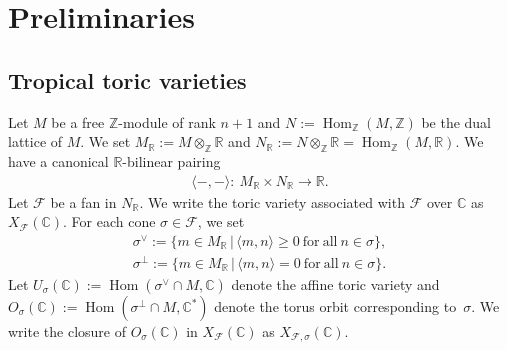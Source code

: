 \documentclass[10pt,a4paper]{amsart}
\numberwithin{equation}{section}
\begin{document}
\section{Preliminaries}\label{sc:2}

\subsection{Tropical toric varieties}

Let $M$ be a free ${\mathbb Z}$-module of rank $n+1$ and $N:=\operatorname{Hom}_{\mathbb Z} (M,{\mathbb Z})$ be the dual lattice of $M$.
We set $M_{\mathbb R}:=M \otimes_{\mathbb Z} {\mathbb R}$ and $N_{\mathbb R}:=N \otimes_{\mathbb Z} {\mathbb R}=\operatorname{Hom}_{\mathbb Z} (M,{\mathbb R})$. We have a canonical ${\mathbb R}$-bilinear pairing
\begin{gather*}
\langle - ,- \rangle \colon \ M_{\mathbb R} \times N_{\mathbb R} \to {\mathbb R}.
\end{gather*}
Let ${\mathcal F}$ be a fan in $N_{\mathbb R}$. We write the toric variety associated with ${\mathcal F}$ over ${\mathbb C}$ as $X_{\mathcal F}({\mathbb C})$.
For each cone $\sigma \in {\mathcal F}$, we set
\begin{gather*}
\sigma^\vee := \{ m \in M_{\mathbb R} \,|\, \langle m,n \rangle \geq 0 \mathrm{\ for\ all\ } n \in \sigma \},\\
\sigma^\perp := \{ m \in M_{\mathbb R} \,|\, \langle m,n \rangle =0 \mathrm{\ for\ all\ } n \in \sigma \}.
\end{gather*}
Let $U_\sigma({\mathbb C}):=\operatorname{Hom}(\sigma^\vee \cap M, {\mathbb C})$ denote the af\/f\/ine toric variety and $O_\sigma({\mathbb C}):=\operatorname{Hom} ( \sigma^{\perp} \cap M, {\mathbb C}^\ast )$ denote the torus orbit corresponding to~$\sigma$. We write the closure of $O_\sigma({\mathbb C})$ in $X_{\mathcal F}({\mathbb C})$ as $X_{{\mathcal F},\sigma}({\mathbb C})$.
\end{document}
